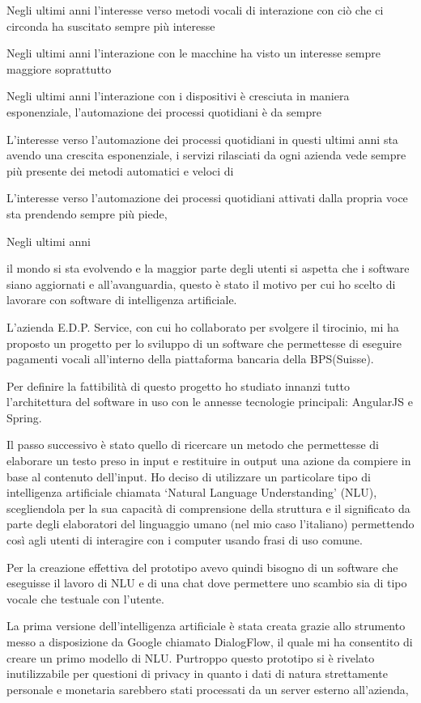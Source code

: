 Negli ultimi anni l'interesse verso metodi vocali di interazione con ciò che ci circonda ha suscitato sempre più interesse

Negli ultimi anni l'interazione con le macchine ha visto un interesse sempre maggiore soprattutto 

Negli ultimi anni l'interazione con i dispositivi è cresciuta in maniera esponenziale, l'automazione dei processi quotidiani è da sempre 

L'interesse verso l'automazione dei processi quotidiani in questi ultimi anni sta avendo una crescita esponenziale, i servizi rilasciati da ogni azienda vede sempre più presente dei metodi automatici e veloci di 

L'interesse verso l'automazione dei processi quotidiani attivati dalla propria voce sta prendendo sempre più piede, 



Negli ultimi anni 


il mondo si sta evolvendo e la maggior parte degli utenti si aspetta che i software siano aggiornati e all’avanguardia, questo è stato il motivo per cui ho scelto di lavorare con software di intelligenza artificiale.

L’azienda E.D.P. Service, con cui ho collaborato per svolgere il tirocinio, mi ha proposto un progetto per lo sviluppo di un software che permettesse di eseguire pagamenti vocali all’interno della piattaforma bancaria della BPS(Suisse).

Per definire la fattibilità di questo progetto ho studiato innanzi tutto l’architettura del software in uso con le annesse tecnologie principali: AngularJS e Spring.

Il passo successivo è stato quello di ricercare un metodo che permettesse di elaborare un testo preso in input e restituire in output una azione da compiere in base al contenuto dell’input. Ho deciso di utilizzare un particolare tipo di intelligenza artificiale chiamata ‘Natural Language Understanding’ (NLU), scegliendola per la sua capacità di comprensione della struttura e il significato da parte degli elaboratori del linguaggio umano (nel mio caso l’italiano) permettendo così agli utenti di interagire con i computer usando frasi di uso comune.

Per la creazione effettiva del prototipo avevo quindi bisogno di un software che eseguisse il lavoro di NLU e di una chat dove permettere uno scambio sia di tipo vocale che testuale con l’utente.

La prima versione dell’intelligenza artificiale è stata creata grazie allo strumento messo a disposizione da Google chiamato DialogFlow, il quale mi ha consentito di creare un primo modello di NLU. Purtroppo questo prototipo si è rivelato inutilizzabile per questioni di privacy in quanto i dati di natura strettamente personale e monetaria sarebbero stati processati da un server esterno all’azienda, 





